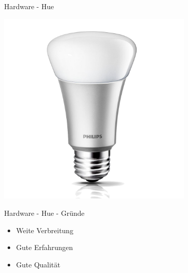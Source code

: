 \begin{frame}{Hardware - Hue}
  \begin{center}
    \includegraphics[width=0.7\textwidth]{images/hue}
    \label{fig:hue}
  \end{center}
\end{frame}

\begin{frame}{Hardware - Hue - Gründe}
  \Large
  \begin{itemize}
    \item Weite Verbreitung
    \item Gute Erfahrungen
    \item Gute Qualität
  \end{itemize}
\end{frame}